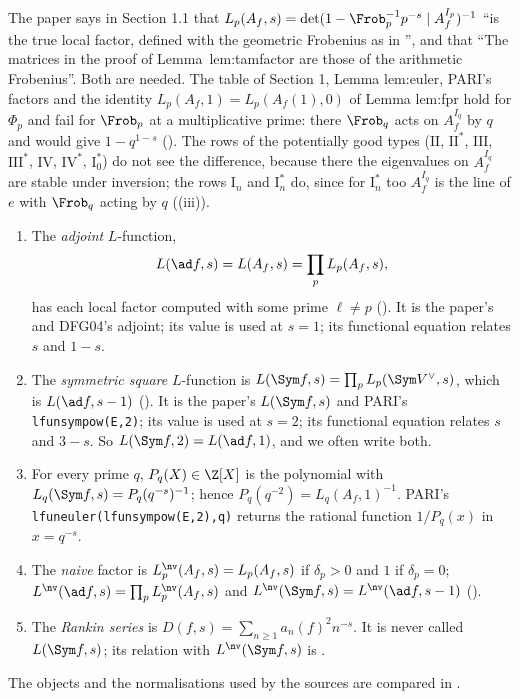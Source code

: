 \begin{warning}\label{warn:lfunctions:two-frobenii}
The paper says in Section 1.1 that $L_p(A_f,s)=\det(1-\Frob_p^{-1}p^{-s}\mid A_f^{I_p})^{-1}$ ``is the true local factor, defined with the geometric Frobenius as in
\cite[\S1.1.1]{DFG04}'', and that ``The matrices in the proof of Lemma~lem:tamfactor are those of the arithmetic Frobenius''. Both are needed. The table of
Section 1, Lemma lem:euler, PARI's factors and the identity $L_p(A_f,1)=L_p(A_f(1),0)$ of Lemma lem:fpr hold for $\Phi_p$ and fail for $\Frob_p$ at a
multiplicative prime: there $\Frob_q$ acts on $A_f^{I_q}$ by $q$ and would give $1-q^{1-s}$ (). The rows of the potentially good types
($\mathrm{II}$, $\mathrm{II}^*$, $\mathrm{III}$, $\mathrm{III}^*$, $\mathrm{IV}$, $\mathrm{IV}^*$, $\mathrm I_0^*$) do not see the difference, because there the eigenvalues on $A_f^{I_q}$
are stable under inversion; the rows $\mathrm I_n$ and $\mathrm I_n^*$ do, since for $\mathrm I_n^*$ too $A_f^{I_q}$ is the line of $e$ with $\Frob_q$ acting by $q$
((iii)).
\end{warning}

\begin{convention}\label{conv:lfunctions:normalisations}
\begin{enumerate}[label=(\alph*)]
\item The \emph{adjoint} $L$-function,
\[
L(\ad f,s)=L(A_f,s)=\prod_pL_p(A_f,s),
\]
has each local factor computed with some prime $\ell\ne p$ (). It is the paper's and DFG04's adjoint; its value is used at $s=1$; its functional equation relates $s$ and $1-s$.
\item The \emph{symmetric square} $L$-function is $L(\Sym f,s)=\prod_pL_p(\Sym V^\vee,s)$, which is $L(\ad f,s-1)$ (). It is the paper's $L(\Sym f,s)$ and
PARI's \texttt{lfunsympow(E,2)}; its value is used at $s=2$; its functional equation relates $s$ and $3-s$. So $L(\Sym f,2)=L(\ad f,1)$, and we often write both.
\item For every prime $q$, $P_q(X)\in\Z[X]$ is the polynomial with $L_q(\Sym f,s)=P_q(q^{-s})^{-1}$; hence $P_q(q^{-2})=L_q(A_f,1)^{-1}$. PARI's
\texttt{lfuneuler(lfunsympow(E,2),q)} returns the rational function $1/P_q(x)$ in $x=q^{-s}$.
\item The \emph{naive} factor is $L_p^{\nv}(A_f,s)=L_p(A_f,s)$ if $\delta_p>0$ and $1$ if $\delta_p=0$; $L^{\nv}(\ad f,s)=\prod_pL_p^{\nv}(A_f,s)$ and
$L^{\nv}(\Sym f,s)=L^{\nv}(\ad f,s-1)$ ().
\item The \emph{Rankin series} is $D(f,s)=\sum_{n\ge1}a_n(f)^2n^{-s}$. It is never called $L(\Sym f,s)$; its relation with $L^{\nv}(\Sym f,s)$ is
.
\end{enumerate}
The objects and the normalisations used by the sources are compared in .
\end{convention}

